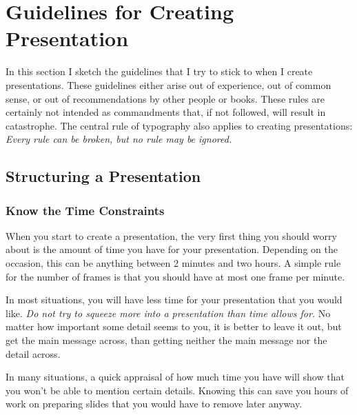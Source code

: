 %

\section{Guidelines for Creating Presentation}


\label{section-guidelines}

In this section I sketch the guidelines that I try to stick to when I
create presentations. These guidelines either arise out of experience,
out of common sense, or out of recommendations by other people or
books. These rules are certainly not intended as commandments that, if
not followed, will result in catastrophe. The central rule of
typography also applies to creating presentations: \emph{Every rule
  can be broken, but no rule may be ignored.} 




\subsection{Structuring a Presentation}

\label{section-structure-guidelines}



\subsubsection{Know the Time Constraints}

When you start to create a presentation, the very first thing you
should worry about is the amount of time you have for your
presentation. Depending on the occasion, this can
be anything between 2 minutes and two hours. A simple rule for the
number of frames is that you should have at most one frame per
minute.

In most situations, you will have less time for your presentation that
you would like. \emph{Do not try to squeeze more into a
  presentation than time allows for.} No matter how important some
detail seems to you, it is better to leave it out, but get the main
message across, than getting neither the main message nor the detail
across. 

In many situations, a quick appraisal of how much time you have will
show that you won't be able to mention certain details. Knowing this can
save you hours of work on preparing slides that you would have to remove
later anyway.



